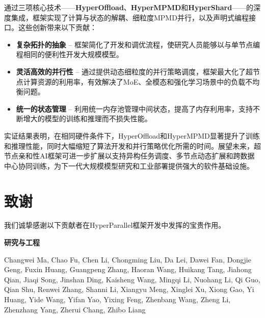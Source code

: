 \documentclass[11pt]{article}
\begin{document}
通过三项核心技术——\textbf{HyperOffload}、\textbf{HyperMPMD}和\textbf{HyperShard}——的深度集成，框架实现了计算与状态的解耦、细粒度MPMD并行，以及声明式编程接口。这些创新带来以下贡献：

\begin{itemize}
    \item \textbf{复杂拓扑的抽象} -- 框架简化了开发和调优流程，使研究人员能够以与单节点编程相同的便利性开发大规模模型。
    \item \textbf{灵活高效的并行性} -- 通过提供动态细粒度的并行策略调度，框架最大化了超节点计算资源的利用率，有效解决了MoE、全模态和强化学习场景中的负载不均衡问题。
    \item \textbf{统一的状态管理} -- 利用统一内存池管理中间状态，提高了内存利用率，支持不断增大的模型的训练和推理而不损失性能。
\end{itemize}

实证结果表明，在相同硬件条件下，HyperOffload和HyperMPMD显著提升了训练和推理性能，同时大幅缩短了算法开发和并行策略优化所需的时间。展望未来，超节点亲和性AI框架可进一步扩展以支持异构任务调度、多节点动态扩展和跨数据中心协同训练，为下一代大规模模型研究和工业部署提供强大的软件基础设施。

\section{致谢}
我们诚挚感谢以下贡献者在HyperParallel框架开发中发挥的宝贵作用。

\noindent \textbf{研究与工程}

\noindent Changwei Ma,
Chao Fu,
Chen Li,
Chongming Liu,
Da Lei,
Dawei Fan,
Dongjie Geng,
Fuxin Huang,
Guangpeng Zhang,
Haoran Wang,
Huikang Tang,
Jiahong Qian,
Jiaqi Song,
Jinshan Ding,
Kaisheng Wang,
Mingqi Li,
Nuohang Li,
Qi Guo,
Qian Shu,
Renwei Zhang,
Shanni Li,
Xiangyu Meng,
Xinglei Xu,
Xiong Gao,
Yi Huang,
Yide Wang,
Yifan Yao,
Yixing Feng,
Zhenbang Wang,
Zheng Li,
Zhenzhang Yang,
Zherui Chang,
Zhibo Liang



\end{document}
